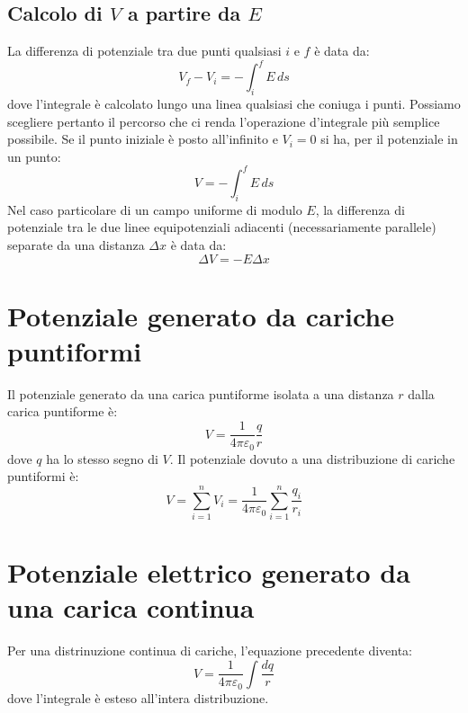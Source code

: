             \subsection{Calcolo di $V$ a partire da $E$} La differenza di 
            potenziale tra due punti qualsiasi $i$ e $f$ è data da:
                \begin{equation}
                    V_f - V_i = - \int_{i}^{f} E \,ds
                \end{equation}
            dove l'integrale è calcolato lungo una linea qualsiasi che coniuga 
            i punti. Possiamo scegliere pertanto il percorso che ci renda 
            l'operazione d'integrale più semplice possibile. Se il punto 
            iniziale è posto all'infinito e $V_i = 0$ si ha, per il potenziale
            in un punto:
                \begin{equation}
                    V = -\int_{i}^{f} E \,ds
                \end{equation}
            Nel caso particolare di un campo uniforme di modulo $E$, la 
            differenza di potenziale tra le due linee equipotenziali adiacenti
            (necessariamente parallele) separate da una distanza $\Delta x$ è 
            data da:
                \begin{equation}
                    \Delta V = -E\Delta x
                \end{equation}

        \section{Potenziale generato da cariche puntiformi} Il potenziale 
        generato da una carica puntiforme isolata a una distanza $r$ dalla 
        carica puntiforme è:
            \begin{equation}
                V = \frac{1}{4\pi\varepsilon_0}\frac{q}{r}
            \end{equation}
        dove $q$ ha lo stesso segno di $V$. Il potenziale dovuto a una 
        distribuzione di cariche puntiformi è:
            \begin{equation}
                V = \sum_{i = 1}^{n}V_i = \frac{1}{4\pi\varepsilon_0}
                \sum_{i = 1}^{n}\frac{q_i}{r_i}
            \end{equation}

        \section{Potenziale elettrico generato da una carica continua} Per una 
        distrinuzione continua di cariche, l'equazione precedente diventa:
            \begin{equation}
                V = \frac{1}{4\pi\varepsilon_0}\int \frac{dq}{r}
            \end{equation}
        dove l'integrale è esteso all'intera distribuzione.

